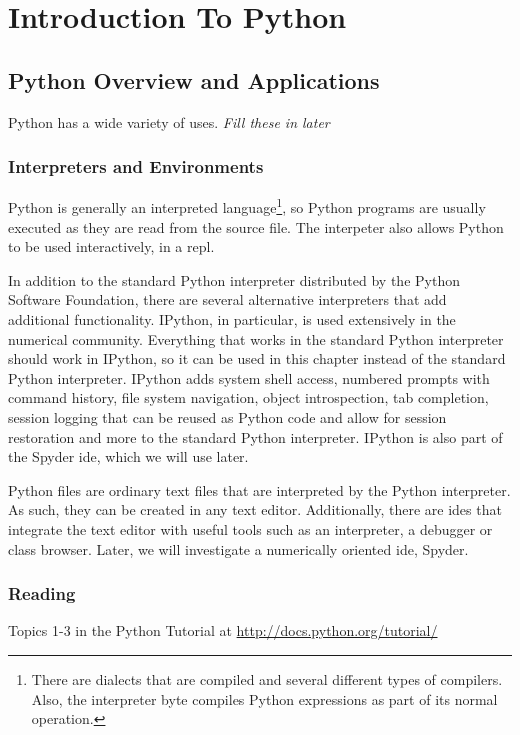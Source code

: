 
\chapter{Introduction To Python}
\section{Python Overview and Applications}
Python has a wide variety of uses. \emph{Fill these in later}
\subsection{Interpreters and Environments}

Python is generally an interpreted language\footnote{There are dialects that are compiled and several different types of compilers. Also, the interpreter byte compiles Python expressions as part of its normal operation.}, so Python programs are usually executed as they are read from the source file. The interpeter also allows Python to be used interactively, in a \gls{repl}. 

In addition to the standard Python interpreter distributed by the Python Software Foundation, there are several alternative interpreters that add additional functionality. IPython\cite{ipython}, in particular, is used extensively in the numerical community. Everything that works in the standard Python interpreter should work in IPython, so it can be used in this chapter instead of the standard Python interpreter. IPython adds system shell access, numbered prompts with command history, file system navigation, object introspection, tab completion, session logging that can be reused as Python code and allow for session restoration and more to the standard Python interpreter. IPython is also part of the Spyder \gls{ide}, which we will use later.

Python files are ordinary text files that are interpreted by the Python interpreter.  As such, they can be created in any text editor. Additionally, there are \glspl{ide} that integrate the text editor with useful tools such as an interpreter, a debugger or class browser. Later, we will investigate a numerically oriented \gls{ide}, \gls{Spyder}.\cite{website:spyder} 

\subsection{Reading}
Topics 1-3 in the Python Tutorial at \url{http://docs.python.org/tutorial/} \cite{website:Python272docs}

